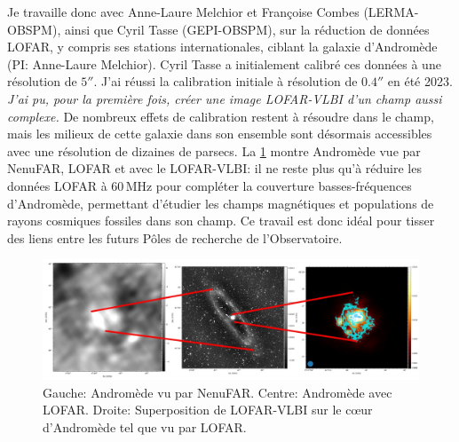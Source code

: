 %
%




\pg
Je travaille donc avec Anne-Laure Melchior et Fran\c{c}oise Combes (LERMA-OBSPM), ainsi que Cyril Tasse (GEPI-OBSPM),  sur la r\'eduction de donn\'ees LOFAR, y compris ses stations internationales, ciblant la galaxie d'Androm\`ede (PI: Anne-Laure Melchior). Cyril Tasse a initialement calibr\'e ces donn\'ees \`a une r\'esolution de $5''$. J'ai r\'eussi la calibration initiale \`a r\'esolution de $0.4''$ en \'et\'e 2023. \textit{J'ai pu, pour la premi\`ere fois, cr\'eer une image LOFAR-VLBI d'un champ aussi complexe.} De nombreux effets de calibration restent \`a r\'esoudre dans le champ, mais les milieux de cette galaxie dans son ensemble sont d\'esormais accessibles avec une r\'esolution de dizaines de parsecs. La \cref{fig.andromeda} montre Androm\`ede vue par NenuFAR, LOFAR et avec le LOFAR-VLBI: il ne reste plus qu'\`a r\'eduire les donn\'ees LOFAR \`a 60\,MHz pour compl\'eter la couverture basses-fr\'equences d'Androm\`ede, permettant d'\'etudier les champs magn\'etiques et populations de rayons cosmiques fossiles dans son champ. Ce travail est donc id\'eal pour tisser des liens entre les futurs P\^oles de recherche de l'Observatoire.

\begin{figure}[H]
	\includegraphics[width=\linewidth]{ProjetRecherche/andromeda-full.jpeg}
	\caption{Gauche: Androm\`ede vu par NenuFAR. Centre: Androm\`ede avec LOFAR. Droite: Superposition de LOFAR-VLBI sur le c{\oe}ur d'Androm\`ede tel que vu par LOFAR.} \label{fig.andromeda}
\end{figure}

